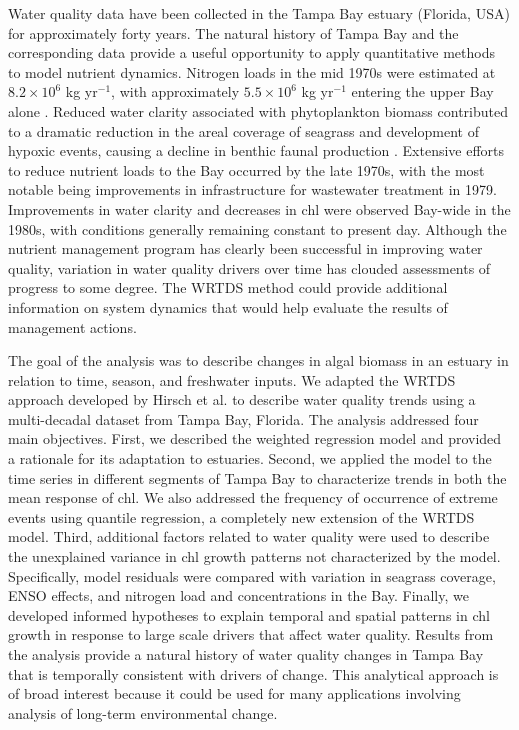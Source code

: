 \documentclass{svjour3}\usepackage[]{graphicx}\usepackage[]{color}
\begin{document}
Water quality data have been collected in the Tampa Bay estuary (Florida, USA) for approximately forty years.  The natural history of Tampa Bay and the corresponding data provide a useful opportunity to apply quantitative methods to model nutrient dynamics. Nitrogen loads in the mid 1970s were estimated at $8.2 \times 10^6$ kg yr$^{-1}$, with approximately $5.5 \times 10^6$ kg yr$^{-1}$ entering the upper Bay alone \cite{Poe05,Greening06}.  Reduced water clarity associated with phytoplankton biomass contributed to a dramatic reduction in the areal coverage of seagrass \cite{Tomasko05} and development of hypoxic events, causing a decline in benthic faunal production \cite{Santos80}.  Extensive efforts to reduce nutrient loads to the Bay occurred by the late 1970s, with the most notable being improvements in infrastructure for wastewater treatment in 1979.  Improvements in water clarity and decreases in \ac{chl} were observed Bay-wide in the 1980s, with conditions generally remaining constant to present day. Although the nutrient management program has clearly been successful in improving water quality, variation in water quality drivers over time has clouded assessments of progress to some degree.  The \ac{WRTDS} method could provide additional information on system dynamics that would help evaluate the results of management actions.

The goal of the analysis was to describe changes in algal biomass in an estuary in relation to time, season, and freshwater inputs.  We adapted the \ac{WRTDS} approach developed by Hirsch et al. \cite{Hirsch10} to describe water quality trends using a multi-decadal dataset from Tampa Bay, Florida. The analysis addressed four main objectives.  First, we described the weighted regression model and provided a rationale for its adaptation to estuaries.  Second, we applied the model to the time series in different segments of Tampa Bay to characterize trends in both the mean response of \ac{chl}.  We also addressed the frequency of occurrence of extreme events using quantile regression, a completely new extension of the \ac{WRTDS} model.  Third, additional factors related to water quality were used to describe the unexplained variance in \ac{chl} growth patterns not characterized by the model.  Specifically, model residuals were compared with variation in seagrass coverage, \ac{ENSO} effects, and nitrogen load and concentrations in the Bay.  Finally, we developed informed hypotheses to explain temporal and spatial patterns in \ac{chl} growth in response to large scale drivers that affect water quality.  Results from the analysis provide a natural history of water quality changes in Tampa Bay that is temporally consistent with drivers of change.  This analytical approach is of broad interest because it could be used for many applications involving analysis of long-term environmental change.  
\end{document}
